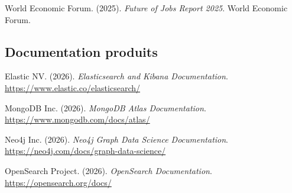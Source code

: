 \documentclass[11pt,a4paper,openany]{report}
\begin{document}
World Economic Forum. (2025). \emph{Future of Jobs Report 2025}. World Economic Forum.

\subsection*{Documentation produits}

Elastic NV. (2026). \emph{Elasticsearch and Kibana Documentation}. \url{https://www.elastic.co/elasticsearch/}

MongoDB Inc. (2026). \emph{MongoDB Atlas Documentation}. \url{https://www.mongodb.com/docs/atlas/}

Neo4j Inc. (2026). \emph{Neo4j Graph Data Science Documentation}. \url{https://neo4j.com/docs/graph-data-science/}

OpenSearch Project. (2026). \emph{OpenSearch Documentation}. \url{https://opensearch.org/docs/}

\endgroup
\end{document}
